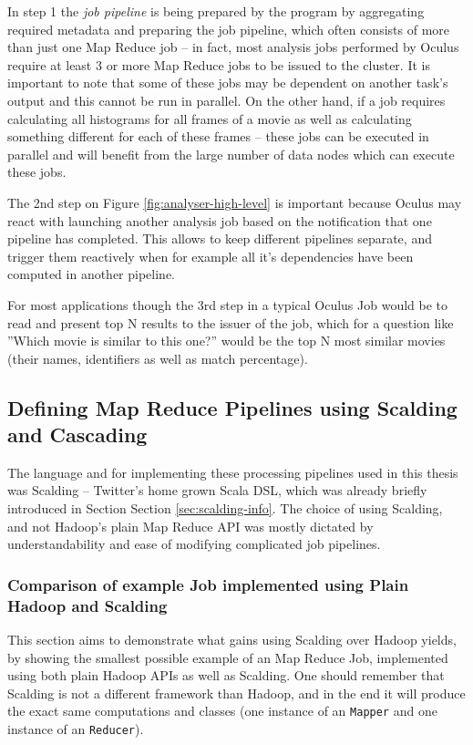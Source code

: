 In step 1 the \textit{job pipeline} is being prepared by the program by aggregating required metadata and preparing the job pipeline, which often consists of more than just one Map Reduce job -- in fact, most analysis jobs performed by Oculus require at least 3 or more Map Reduce jobs to be issued to the cluster. It is important to note that some of these jobs may be dependent on another task's output and this cannot be run in parallel. On the other hand, if a job requires calculating all histograms for all frames of a movie as well as calculating something different for each of these frames -- these jobs can be executed in parallel and will benefit from the large number of data nodes which can execute these jobs.

The 2nd step on Figure \ref{fig:analyser-high-level} is important because Oculus may react with launching another analysis job based on the notification that one pipeline has completed. This allows to keep different pipelines separate, and trigger them reactively when for example all it's dependencies have been computed in another pipeline.

For most applications though the 3rd step in a typical Oculus Job would be to read and present top N results to the issuer of the job, which for a question like ''Which movie is similar to this one?'' would be the top N most similar movies (their names, identifiers as well as match percentage).


\subsection{Defining Map Reduce Pipelines using Scalding and Cascading}
\label{sec:scalding-jobs}
The language and for implementing these processing pipelines used in this thesis was Scalding -- Twitter's home grown Scala DSL, which was already briefly introduced in Section Section \ref{sec:scalding-info}. The choice of using Scalding, and not Hadoop's plain Map Reduce API was mostly dictated by understandability and ease of modifying complicated job pipelines. 

\subsubsection{Comparison of example Job implemented using Plain Hadoop and Scalding}

This section aims to demonstrate what gains using Scalding over Hadoop yields, by showing the smallest possible example of an Map Reduce Job, implemented using both plain Hadoop APIs as well as Scalding. One should remember that Scalding is not a different framework than Hadoop, and in the end it will produce the exact same computations and classes (one instance of an \verb|Mapper| and one instance of an \verb|Reducer|).

